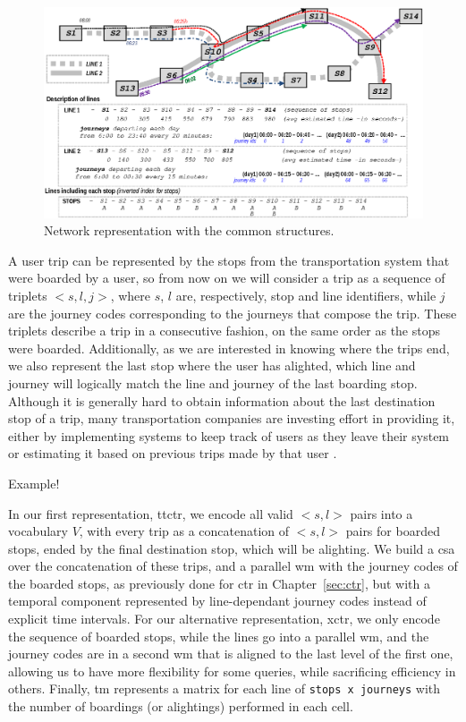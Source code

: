     \begin{figure}[ht]
        \includegraphics[width=\textwidth]{figures/network.eps}
        \caption{Network representation with the common structures.}
        \label{fig:example_trips_ttctr}
    \end{figure}
    
    A user trip can be represented by the stops from the transportation system that were boarded by a user, so from now on we will consider a trip as a sequence of triplets $<s,l,j>$, where $s$, $l$ are, respectively, stop and line identifiers, while $j$ are the journey codes corresponding to the journeys that compose the trip. These triplets describe a trip in a consecutive fashion, on the same order as the stops were boarded. Additionally, as we are interested in knowing where the trips end, we also represent the last stop where the user has alighted, which line and journey will logically match the line and journey of the last boarding stop. Although it is generally hard to obtain information about the last destination stop of a trip, many transportation companies are investing effort in providing it, either by implementing systems to keep track of users as they leave their system or estimating it based on previous trips made by that user \cite{alsger2016validating}.
    
    Example!
    
    In our first representation, \gls{ttctr}, we encode all valid $<s,l>$ pairs into a vocabulary $V$, with every trip as a concatenation of $<s,l>$ pairs for boarded stops, ended by the final destination stop, which will be alighting. We build a \gls{csa} over the concatenation of these trips, and a parallel \gls{wm} with the journey codes of the boarded stops, as previously done for \gls{ctr} in Chapter~\ref{sec:ctr}, but with a temporal component represented by line-dependant journey codes instead of explicit time intervals. For our alternative representation, \gls{xctr}, we only encode the sequence of boarded stops, while the lines go into a parallel \gls{wm}, and the journey codes are in a second \gls{wm} that is aligned to the last level of the first one, allowing us to have more flexibility for some queries, while sacrificing efficiency in others. Finally, \gls{tm} represents a matrix for each line of \texttt{stops x journeys} with the number of boardings (or alightings) performed in each cell.
	
